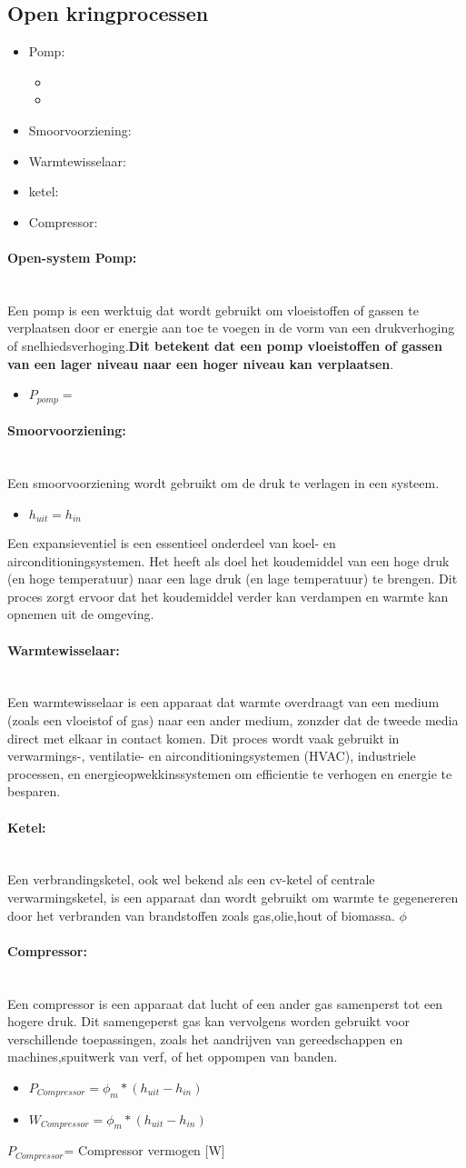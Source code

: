 \documentclass[12pt]{article}
\newcommand{\myparagraph}[1]{\paragraph{#1}\mbox{}\\}
\begin{document}
\subsection{Open kringprocessen}
\begin{itemize}
    \item Pomp:\begin{itemize}
        \item %
    \end{itemize}\begin{itemize}
        \item %
    \end{itemize}
    \item Smoorvoorziening:
    \item Warmtewisselaar:
    \item ketel:
    \item Compressor:
\end{itemize}
\myparagraph{Open-system Pomp:}
Een pomp is een werktuig dat wordt gebruikt om vloeistoffen of gassen te verplaatsen door er energie aan toe te voegen in de vorm van een drukverhoging of snelhiedsverhoging.\textbf{Dit betekent dat een pomp vloeistoffen 
of gassen van een lager niveau naar een hoger niveau kan verplaatsen}.
\begin{itemize}
    \item $P_{pomp}=$
\end{itemize}
\myparagraph{Smoorvoorziening:}
Een smoorvoorziening wordt gebruikt om de druk te verlagen in een systeem.
\begin{itemize}
    \item[] $h_{uit}=h_{in}$
\end{itemize}
Een expansieventiel is een essentieel onderdeel van koel- en airconditioningsystemen. Het heeft als doel het koudemiddel van een hoge druk (en hoge temperatuur) naar een lage druk (en lage temperatuur) te brengen. Dit proces zorgt ervoor dat het koudemiddel verder kan verdampen en warmte kan opnemen uit de omgeving.
\myparagraph{Warmtewisselaar:}
Een warmtewisselaar is een apparaat dat warmte overdraagt van een medium (zoals een vloeistof of gas) naar een ander medium, zonzder dat de tweede media direct met elkaar in contact komen. Dit proces wordt vaak gebruikt in verwarmings-, ventilatie- en airconditioningsystemen (HVAC), industriele processen, en energieopwekkinssystemen om efficientie te verhogen en energie te besparen.
\myparagraph{Ketel:}
Een verbrandingsketel, ook wel bekend als een cv-ketel of centrale verwarmingsketel, is een apparaat dan wordt gebruikt om warmte te gegenereren door het verbranden van brandstoffen zoals gas,olie,hout of biomassa.
$\phi$
\myparagraph{Compressor:}
Een compressor is een apparaat dat lucht of een ander gas samenperst tot een hogere druk.
Dit samengeperst gas kan vervolgens worden gebruikt voor verschillende toepassingen, zoals het aandrijven  van gereedschappen en machines,spuitwerk van verf, of het oppompen van banden.
\begin{itemize}
    \item[] $P_{Compressor}=\phi_{m}*(h_{uit}-h_{in})$
    \item[] $W_{Compressor}=\phi_{m}*(h_{uit}-h_{in})$
\end{itemize}
$P_{Compressor}$= Compressor vermogen [W]
\end{document}
